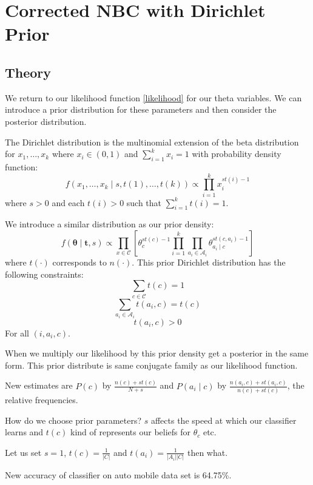 \chapter{Corrected NBC with Dirichlet Prior}

\section{Theory}

We return to our likelihood function \cref{likelihood} for our theta variables.
We can introduce a prior distribution for these parameters and then consider the posterior distribution.

The Dirichlet distribution is the multinomial extension of the beta distribution for $x_1,\dots,x_k$ where $x_i \in (0,1)$ and $\sum_{i=1}^k x_i = 1$ with probability density function:
\begin{equation} \label{dirichlet_pdf}
	f(x_1,\dots,x_k \mid s, t(1),\dots,t(k)) \propto \prod_{i=1}^k x_i^{st(i) - 1}
\end{equation}
where $s > 0$ and each $t(i)>0$ such that $\sum_{i=1}^{k}t(i) = 1$.

We introduce a similar distribution as our prior density:
\begin{equation} \label{prior}
	f(\mathbf{\theta} \mid \mathbf{t}, s) \propto \prod_{x \in \mathcal{C}} \left[ \theta_c^{st(c) - 1} \prod_{i=1}^k \prod_{a_i \in \mathcal{A}_i} \theta_{a_i \mid c}^{st(c, a_i) - 1} \right]
\end{equation}
where $t(\cdot)$ corresponds to $n(\cdot)$.
This prior Dirichlet distribution \cite{Zaffalon01} has the following constraints:
\begin{equation}
	\sum_{c \in \mathcal{C}} t(c) = 1
\end{equation}
\begin{equation}
	\sum_{a_i \in \mathcal{A}_i} t(a_i, c) = t(c)
\end{equation}
\begin{equation}
	t(a_i, c) > 0
\end{equation}
For all $(i, a_i, c)$.

When we multiply our likelihood by this prior density get a posterior in the same form.
This prior distribute is same conjugate family as our likelihood function.

New estimates are $P(c)$ by $\frac{n(c) + st(c)}{N + s}$ and $P(a_i \mid c)$ by $\frac{n(a_i, c) + st(a_i,c)}{n(c)+st(c)}$, the relative frequencies.

How do we choose prior parameters? $s$ affects the speed at which our classifier learns and $t(c)$ kind of represents our beliefs for $\theta_c$ etc.

Let us set $s=1$, $t(c) = \frac{1}{|C|}$ and $t(a_i) = \frac{1}{|A_i||C|}$ then what.

New accuracy of classifier on auto mobile data set is 64.75\%.